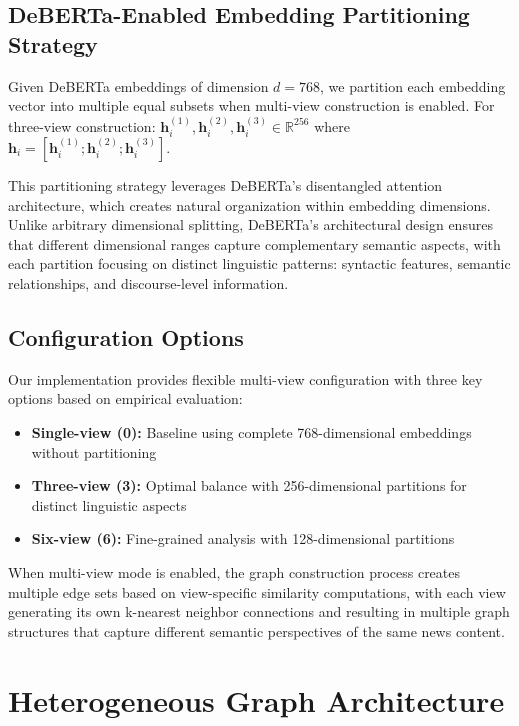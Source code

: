 \subsection{DeBERTa-Enabled Embedding Partitioning Strategy}

Given DeBERTa embeddings of dimension $d = 768$, we partition each embedding vector into multiple equal subsets when multi-view construction is enabled. For three-view construction: $\mathbf{h}_i^{(1)}, \mathbf{h}_i^{(2)}, \mathbf{h}_i^{(3)} \in \mathbb{R}^{256}$ where $\mathbf{h}_i = [\mathbf{h}_i^{(1)}; \mathbf{h}_i^{(2)}; \mathbf{h}_i^{(3)}]$.

This partitioning strategy leverages DeBERTa's disentangled attention architecture, which creates natural organization within embedding dimensions. Unlike arbitrary dimensional splitting, DeBERTa's architectural design ensures that different dimensional ranges capture complementary semantic aspects, with each partition focusing on distinct linguistic patterns: syntactic features, semantic relationships, and discourse-level information.

\subsection{Configuration Options}

Our implementation provides flexible multi-view configuration with three key options based on empirical evaluation:
\begin{itemize}
\item \textbf{Single-view (0):} Baseline using complete 768-dimensional embeddings without partitioning
\item \textbf{Three-view (3):} Optimal balance with 256-dimensional partitions for distinct linguistic aspects
\item \textbf{Six-view (6):} Fine-grained analysis with 128-dimensional partitions
\end{itemize}

When multi-view mode is enabled, the graph construction process creates multiple edge sets based on view-specific similarity computations, with each view generating its own k-nearest neighbor connections and resulting in multiple graph structures that capture different semantic perspectives of the same news content.

\section{Heterogeneous Graph Architecture}

